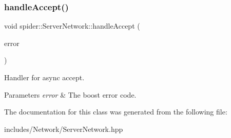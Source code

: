 \subsubsection{handle\+Accept()}
{\footnotesize\ttfamily void spider\+::\+Server\+Network\+::handle\+Accept (\begin{DoxyParamCaption}\item[{boost\+::system\+::error\+\_\+code const \&}]{error }\end{DoxyParamCaption})}



Handler for async accept. 


\begin{DoxyParams}{Parameters}
{\em error} & The boost error code. \\
\hline
\end{DoxyParams}


The documentation for this class was generated from the following file\+:\begin{DoxyCompactItemize}
\item 
includes/\+Network/Server\+Network.\+hpp\end{DoxyCompactItemize}
